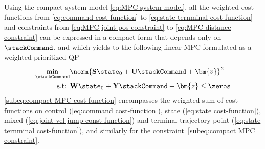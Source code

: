 
Using the compact system model \cref{eq:MPC system model}, all the weighted cost-functions from \cref{eq:command cost-function} to \cref{eq:state ternminal cost-function} and constraints from \cref{eq:MPC joint-pos constraint} to \cref{eq:MPC distance constraint} can be expressed in a compact form that depends only on $\stackCommand$, and which yields to the following  linear MPC formulated as a  weighted-prioritized QP
\begin{subequations}\label{eq:compact MPC}
	\begin{align}
		\label{subeq:compact MPC cost-function}\underset{\stackCommand}{\min}& \norm{\mathbf{S}\state_{0}+\mathbf{U}\stackCommand + \bm{v}}^2 \\ 
		\label{subeq:compact MPC constraint}\text{s.t: } &\mathbf{W}\state_{0} + \mathbf{Y}\stackCommand +\bm{z} \leq \zeros
	\end{align}
\end{subequations}
\cref{subeq:compact MPC cost-function} encompasses the weighted sum of cost-functions on control (\cref{eq:command cost-function}), state (\cref{eq:state cost-function}), mixed (\cref{eq:joint-vel jump const-function}) and terminal trajectory point (\cref{eq:state ternminal cost-function}), and similarly for the constraint~\cref{subeq:compact MPC constraint}.



